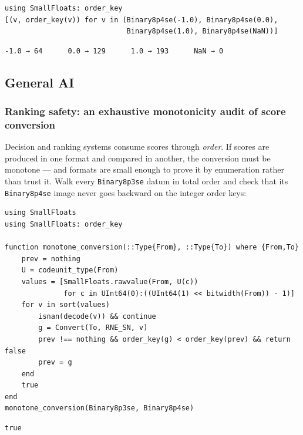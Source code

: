 \nopagebreak[4]
\begin{minipage}{\linewidth}
\begin{verbatim}
using SmallFloats: order_key
[(v, order_key(v)) for v in (Binary8p4se(-1.0), Binary8p4se(0.0),
                             Binary8p4se(1.0), Binary8p4se(NaN))]
\end{verbatim}




\begin{verbatim}
-1.0 → 64      0.0 → 129      1.0 → 193      NaN → 0
\end{verbatim}
\end{minipage}




\subsection{General AI}



\label{12995498770613901834-dup2}{}


\subsubsection{Ranking safety: an exhaustive monotonicity audit of score conversion}



\label{8732453457535267162}{}


Decision and ranking systems consume scores through \emph{order}. If scores are produced in one format and compared in another, the conversion must be monotone — and formats are small enough to prove it by enumeration rather than trust it. Walk every \texttt{Binary8p3se} datum in total order and check that its \texttt{Binary8p4se} image never goes backward on the integer order keys:




\nopagebreak[4]
\begin{minipage}{\linewidth}
\begin{verbatim}
using SmallFloats
using SmallFloats: order_key

function monotone_conversion(::Type{From}, ::Type{To}) where {From,To}
    prev = nothing
    U = codeunit_type(From)
    values = [SmallFloats.rawvalue(From, U(c))
              for c in UInt64(0):((UInt64(1) << bitwidth(From)) - 1)]
    for v in sort(values)
        isnan(decode(v)) && continue
        g = Convert(To, RNE_SN, v)
        prev !== nothing && order_key(g) < order_key(prev) && return false
        prev = g
    end
    true
end
monotone_conversion(Binary8p3se, Binary8p4se)
\end{verbatim}




\begin{verbatim}
true
\end{verbatim}
\end{minipage}




